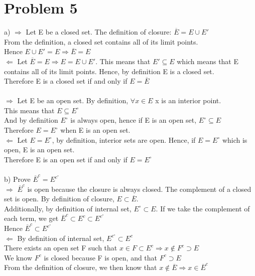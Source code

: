\documentclass{article}
\begin{document}
 \section*{Problem 5}
 a) $\Rightarrow$ Let E be a closed set. The definition of closure: $\overline{E} = E \cup E'$
 \\From the definition, a closed set contains all of its limit points. 
 \\Hence $E \cup E' = E \Rightarrow \overline{E} = E$
 \\$\Leftarrow$ Let $\overline{E} = E \Rightarrow E = E \cup E'$. This means that $E' \subseteq E$ which means that E contains all of its limit points. Hence, by definition E is a closed set.
 \\Therefore E is a closed set if and only if $E = \overline{E}$
\\
 \\$\Rightarrow$ Let E be an open set. By definition, $\forall x \in E$ x is an interior point.
 \\This means that $E \subseteq E^\circ$
 \\And by definition $E^\circ$ is always open, hence if E is an open set, $E^\circ \subseteq E$
 \\Therefore $E = E^\circ$ when E is an open set.
 \\$\Leftarrow$ Let $E = E^\circ$, by definition, interior sets are open. Hence, if $E = E^\circ$ which is open, E is an open set.
 \\Therefore E is an open set if and only if $E = E^\circ$
 \\
 \\b) Prove $\overline{E}^c = E^c^\circ$
 \\$\Rightarrow$ $\overline{E}^c$ is open because the closure is always closed. The complement of a closed set is open. By definition of closure, $E \subset \overline{E}$.
 \\Additionally, by definition of internal set, $E^\circ \subset E$. If we take the complement of each term, we get $\overline{E}^c \subset E^c \subset E^c^\circ$
 \\Hence $\overline{E}^c \subset E^c^\circ$
 \\$\Leftarrow$ By definition of internal set, $E^c^\circ \subset E^c$
 \\There exists an open set F such that $x \in F \subset E^c \Rightarrow x \not \in F^c \supset E$
 \\We know $F^c$ is closed because F is open, and that $F^c \supset E$
 \\From the definition of closure, we then know that $x \not \in \overline{E} \Rightarrow x \in \overline{E}^c$
\end{document}
